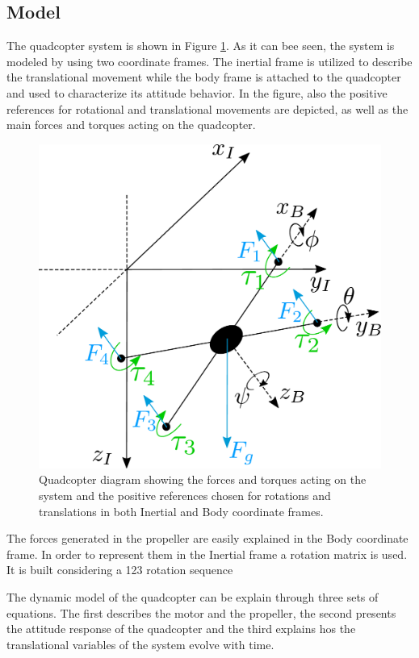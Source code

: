 \subsection{Model}
The quadcopter system is shown in Figure \ref{droneDiagram}. As it can bee seen, the system is modeled by using two coordinate frames. The inertial frame is utilized to describe the translational movement while the body frame is attached to the quadcopter and used to characterize its attitude behavior. In the figure, also the positive references for rotational and translational movements are depicted, as well as the main forces and torques acting on the quadcopter. 
\begin{figure}[H]
	\centering
	\includegraphics[scale=0.3]{figures/droneDiagram}
	\caption{Quadcopter diagram showing the forces and torques acting on the system and the positive references chosen for rotations and translations in both Inertial and Body coordinate frames.}
	\label{droneDiagram}
\end{figure}
The forces generated in the propeller are easily explained in the Body coordinate frame. In order to represent them in the Inertial frame a rotation matrix is used. It is built considering a 123 rotation sequence \cite{rotationmatrix}
 
The dynamic model of the quadcopter can be explain through three sets of equations. The first describes the motor and the propeller, the second presents the attitude response of the quadcopter and the third explains hos the translational variables of the system evolve with time.
